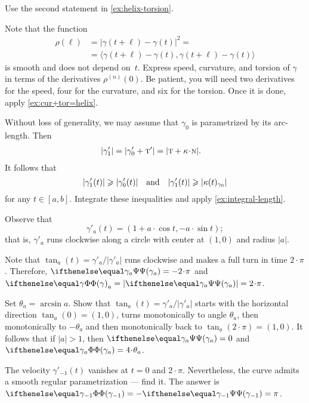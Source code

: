 \begin{multicols}{2}
 Use the second statement in \ref{ex:helix-torsion}.

 Note that the function
\begin{align*}
\rho(\ell)&=|\gamma(t+\ell)-\gamma(t)|^2=
\\
&=\langle \gamma(t+\ell)-\gamma(t),\gamma(t+\ell)-\gamma(t)\rangle
\end{align*}
is smooth and does not depend on~$t$.
Express speed, curvature, and torsion of $\gamma$ in terms of the derivatives $\rho^{(n)}(0)$.
Be patient, you will need two derivatives for the speed,
four for the curvature,
and six for the torsion.
Once it is done, apply \ref{ex:cur+tor=helix}.


\setcounter{eqtn}{0}



Without loss of generality, we may assume that $\gamma_0$ is parametrized by its arc-length.
Then
\begin{align*}
|\gamma_1'|&=|\gamma_0'+\tan'|=|\tan+\kur\cdot\norm|.
\end{align*}
It follows that
\[|\gamma_1'(t)|\geqslant|\gamma_0'(t)|
\quad\text{and}\quad
|\gamma_1'(t)|\geqslant|\kappa(t)_{\gamma_0}|
\]
for any $t\in[a,b]$.
Integrate these inequalities and apply 
\ref{ex:integral-length}.


Observe that 
\[\gamma'_a(t)=(1+a\cdot \cos t, -a\cdot \sin t);\]
that is, $\gamma'_a$ runs clockwise along a circle with center at $(1,0)$ and radius $\vert a \vert$.

 Note that $\tan_a(t)=\gamma'_a/|\gamma'_a|$ runs clockwise and makes a full turn in time $2\cdot\pi$.
Therefore, $\tgc{\gamma_a}=-2\cdot\pi$ and $\tc\gamma_a\z=|\tgc{\gamma_a}|=2\cdot\pi$.

Set $\theta_a=\arcsin a$.
Show that $\tan_a(t)=\gamma'_a/|\gamma'_a|$ starts with the horizontal direction $\tan_a(0)=(1,0)$, turns monotonically to angle $\theta_a$, then monotonically to $-\theta_a$ and then monotonically back to $\tan_a(2\cdot\pi)=(1,0)$.
It follows that if $|a|>1$, then
$\tgc{\gamma_a}=0$ and $\tc{\gamma_a}=4\cdot\theta_a$.

The velocity $\gamma'_{-1}(t)$ vanishes at $t=0$ and $2\cdot\pi$.
Nevertheless, the curve admits a smooth regular parametrization --- find it.
The answer is $\tc{\gamma_{-1}}=-\tgc{\gamma_{-1}}=\pi$.


\end{multicols}
